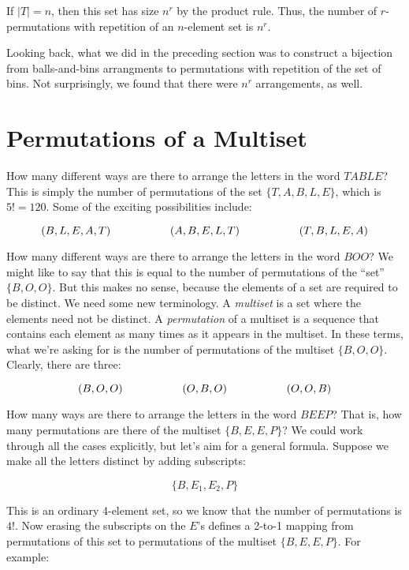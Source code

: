 \documentclass[twoside,12pt]{article}
\begin{document}
\noindent If $|T| = n$, then this set has size $n^r$ by the product
rule.  Thus, the number of $r$-permutations with repetition of an
$n$-element set is $n^r$.

Looking back, what we did in the preceding section was to construct a
bijection from balls-and-bins arrangments to permutations with
repetition of the set of bins.  Not surprisingly, we found that there
were $n^r$ arrangements, as well.

\section{Permutations of a Multiset}

How many different ways are there to arrange the letters in the word
$TABLE$?  This is simply the number of permutations of the set $\{ T,
A, B, L , E \}$, which is $5! = 120$.  Some of the exciting
possibilities include:

\[
(B,L,E,A,T) \hspace{0.75in} (A,B,E,L,T) \hspace{0.75in} (T,B,L,E,A)
\]

How many different ways are there to arrange the letters in the word
$BOO$?  We might like to say that this is equal to the number of
permutations of the ``set'' $\{ B, O, O \}$.  But this makes no sense,
because the elements of a set are required to be distinct.  We need
some new terminology.  A {\em multiset} is a set where the elements
need not be distinct.  A {\em permutation} of a multiset is a sequence
that contains each element as many times as it appears in the
multiset.  In these terms, what we're asking for is the number of
permutations of the multiset $\{ B, O, O \}$.  Clearly, there are
three:

\[
(B,O,O) \hspace{0.75in} (O,B,O) \hspace{0.75in} (O,O,B)
\]

How many ways are there to arrange the letters in the word $BEEP$?
That is, how many permutations are there of the multiset $\{B, E, E,
P\}$?  We could work through all the cases explicitly, but let's aim
for a general formula.  Suppose we make all the letters distinct by
adding subscripts:

\[
\{ B, E_1, E_2, P \}
\]

\noindent This is an ordinary 4-element set, so we know that the
number of permutations is $4!$.  Now erasing the subscripts on the
$E$'s defines a 2-to-1 mapping from permutations of this set to
permutations of the multiset $\{B, E, E, P\}$.  For example:
\end{document}
